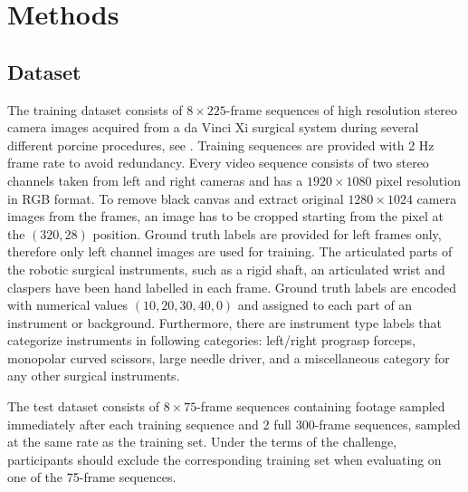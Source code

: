 \documentclass[runningheads,a4paper]{llncs}[2015/06/24]
\begin{document}
\section{Methods}
\subsection{Dataset}
The training dataset consists of $8\times225$-frame sequences of high resolution stereo camera images acquired from a da Vinci Xi surgical system during several different porcine procedures, see \cite{miccai2017}. Training sequences are provided with 2 Hz frame rate to avoid redundancy. Every video sequence consists of two stereo channels taken from left and right cameras and has a $1920\times1080$ pixel resolution in RGB format. To remove black canvas and extract original $1280\times1024$ camera images from the frames, an image has to be cropped starting from the pixel at the $(320, 28)$ position. Ground truth labels are provided for left frames only, therefore only left channel images are used for training. The articulated parts of the robotic surgical instruments, such as a rigid shaft, an articulated wrist and claspers have been hand labelled in each frame. Ground truth labels are encoded with numerical values $(10, 20, 30, 40, 0)$ and assigned to each part of an instrument or background. Furthermore, there are instrument type labels that categorize instruments in following categories: left/right prograsp forceps, monopolar curved scissors, large needle driver, and a miscellaneous category for any other surgical instruments.

The test dataset consists of $8\times75$-frame sequences containing footage sampled immediately after each training sequence and 2 full 300-frame sequences, sampled at the same rate as the training set. Under the terms of the challenge, participants should exclude the corresponding training set when evaluating on one of the 75-frame sequences.


\end{document}

